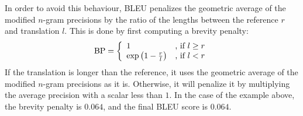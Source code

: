 \documentclass{report}
\newcommand{\BP}{\text{BP}}
\begin{document}
In order to avoid this behaviour, BLEU penalizes the geometric average of the
modified $n$-gram precisions by the ratio of the lengths between the reference
$r$ and translation $l$. This is done by first computing a brevity penalty:
\begin{align*}
    \BP = \left\{ 
        \begin{array}{l l}
            1 & \text{, if }l \geq r \\
            \exp\left( 1 - \frac{r}{l} \right) & \text{, if }l < r
        \end{array}
        \right.
\end{align*}
If the translation is longer than the reference, it uses the geometric average
of the modified $n$-gram precisions as it is. Otherwise, it will penalize it by
multiplying the average precision with a scalar less than $1$. 
In the case of the example above, the brevity penalty is $0.064$, and the final
BLEU score is $0.064$. 
\end{document}
